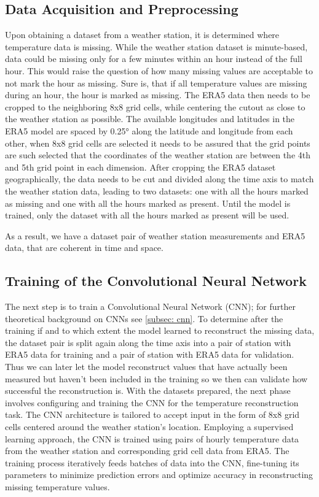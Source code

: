 \subsection{Data Acquisition and Preprocessing}
\label{subsec: data_preprocessing}
Upon obtaining a dataset from a weather station, it is determined where temperature data is missing.
While the weather station dataset is minute-based, data could be missing only for a few minutes within an hour instead of the full hour.
This would raise the question of how many missing values are acceptable to not mark the hour as missing.
Sure is, that if all temperature values are missing during an hour, the hour is marked as missing.
The ERA5 data then needs to be cropped to the neighboring 8x8 grid cells, while centering the cutout as close to the weather station as possible.
The available longitudes and latitudes in the ERA5 model are spaced by 0.25° along the latitude and longitude from each other, when 8x8 grid cells are selected it needs to be assured that the grid points are such selected that the coordinates of the weather station are between the 4th and 5th grid point in each dimension.
After cropping the ERA5 dataset geographically, the data needs to be cut and divided along the time axis to match the weather station data, leading to two datasets: one with all the hours marked as missing and one with all the hours marked as present.
Until the model is trained, only the dataset with all the hours marked as present will be used.

As a result, we have a dataset pair of weather station measurements and ERA5 data, that are coherent in time and space.

\subsection{Training of the Convolutional Neural Network}
The next step is to train a Convolutional Neural Network (CNN); for further theoretical background on CNNs see \autoref{subsec: cnn}.
To determine after the training if and to which extent the model learned to reconstruct the missing data, the dataset pair is split again along the time axis into a pair of station with ERA5 data for training and a pair of station with ERA5 data for validation.
Thus we can later let the model reconstruct values that have actually been measured but haven't been included in the training so we then can validate how successful the reconstruction is.
With the datasets prepared, the next phase involves configuring and training the CNN for the temperature reconstruction task.
The CNN architecture is tailored to accept input in the form of 8x8 grid cells centered around the weather station's location.
Employing a supervised learning approach, the CNN is trained using pairs of hourly temperature data from the weather station and corresponding grid cell data from ERA5.
The training process iteratively feeds batches of data into the CNN, fine-tuning its parameters to minimize prediction errors and optimize accuracy in reconstructing missing temperature values.

